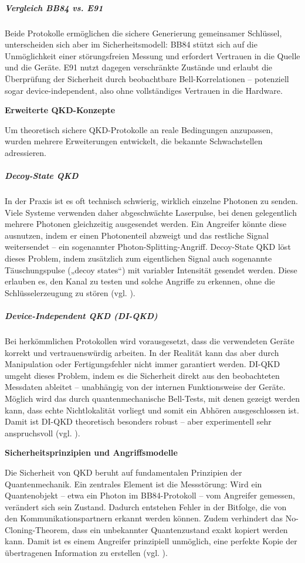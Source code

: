\subparagraph{Vergleich BB84 vs. E91}
Beide Protokolle ermöglichen die sichere Generierung gemeinsamer Schlüssel, unterscheiden sich aber im Sicherheitsmodell:
BB84 stützt sich auf die Unmöglichkeit einer störungsfreien Messung und erfordert Vertrauen in die Quelle und die Geräte.
E91 nutzt dagegen verschränkte Zustände und erlaubt die Überprüfung der Sicherheit durch beobachtbare Bell-Korrelationen – potenziell sogar device-independent, also ohne vollständiges Vertrauen in die Hardware.

\vspace{1em}
\textbf{Erweiterte QKD-Konzepte}


Um theoretisch sichere QKD-Protokolle an reale Bedingungen anzupassen, wurden mehrere Erweiterungen entwickelt, die bekannte Schwachstellen adressieren.
\subparagraph{Decoy-State QKD}
In der Praxis ist es oft technisch schwierig, wirklich einzelne Photonen zu senden. Viele Systeme verwenden daher abgeschwächte Laserpulse, bei denen gelegentlich mehrere Photonen gleichzeitig ausgesendet werden. Ein Angreifer könnte diese ausnutzen, indem er einen Photonenteil abzweigt und das restliche Signal weitersendet – ein sogenannter Photon-Splitting-Angriff.
Decoy-State QKD löst dieses Problem, indem zusätzlich zum eigentlichen Signal auch sogenannte Täuschungspulse („decoy states“) mit variabler Intensität gesendet werden. Diese erlauben es, den Kanal zu testen und solche Angriffe zu erkennen, ohne die Schlüsselerzeugung zu stören (vgl. \cite{scarani_et_al_security_2009}).
 
\subparagraph{Device-Independent QKD (DI-QKD)}
Bei herkömmlichen Protokollen wird vorausgesetzt, dass die verwendeten Geräte korrekt und vertrauenswürdig arbeiten. In der Realität kann das aber durch Manipulation oder Fertigungsfehler nicht immer garantiert werden.
DI-QKD umgeht dieses Problem, indem es die Sicherheit direkt aus den beobachteten Messdaten ableitet – unabhängig von der internen Funktionsweise der Geräte. Möglich wird das durch quantenmechanische Bell-Tests, mit denen gezeigt werden kann, dass echte Nichtlokalität vorliegt und somit ein Abhören ausgeschlossen ist. Damit ist DI-QKD theoretisch besonders robust – aber experimentell sehr anspruchsvoll (vgl. \cite{scarani_et_al_security_2009}).

\vspace{1em}
\textbf{Sicherheitsprinzipien und Angriffsmodelle}


Die Sicherheit von QKD beruht auf fundamentalen Prinzipien der Quantenmechanik. Ein zentrales Element ist die Messstörung: Wird ein Quantenobjekt – etwa ein Photon im BB84-Protokoll – vom Angreifer gemessen, verändert sich sein Zustand. Dadurch entstehen Fehler in der Bitfolge, die von den Kommunikationspartnern erkannt werden können. Zudem verhindert das No-Cloning-Theorem, dass ein unbekannter Quantenzustand exakt kopiert werden kann. Damit ist es einem Angreifer prinzipiell unmöglich, eine perfekte Kopie der übertragenen Information zu erstellen (vgl. \cite{scarani_et_al_security_2009}).


